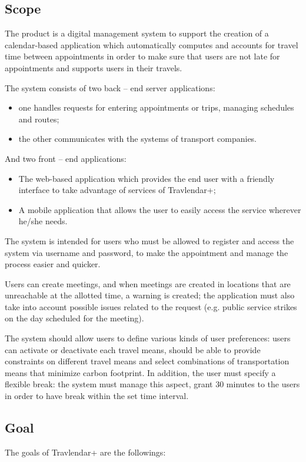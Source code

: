 \documentclass{article}
\begin{document}
	
	\subsection{Scope}
	The product is a digital management system to support the creation of a calendar-based application which automatically computes and accounts for travel time between appointments in order to make sure that users are not late for appointments and supports users in their travels.

	\bigskip
	The system consists of two back -- end server applications:
	\begin{itemize}
		\item one handles requests for entering appointments or trips, managing schedules and routes;
		\item the other communicates with the systems of transport companies.
	\end{itemize}

	\bigskip
	And two front -- end applications:
	\begin{itemize}
		\item The web-based application which provides the end user with a friendly interface to take advantage of services of Travlendar+;
		\item A mobile application that allows the user to easily access the service wherever he/she needs.
	\end{itemize}

	\bigskip
	The system is intended for users who must be allowed to register and access the system via username and password, to make the appointment and manage the process easier and quicker.

	Users can create meetings, and when meetings are created in locations that are unreachable at the allotted time, a warning is created; the application must also take into account possible issues related to the request (e.g. public service strikes on the day scheduled for the meeting). 
	
	\bigskip
	The system should allow users to define various kinds of user preferences: users can activate or deactivate each travel means, should be able to provide constraints on different travel means and select combinations of transportation means that minimize carbon footprint. In addition, the user must specify a flexible break: the system must manage this aspect, grant 30 minutes to the users in order to have break within the set time interval.
	
	
	\subsection{Goal}
	The goals of Travlendar+ are the followings:
\end{document}
